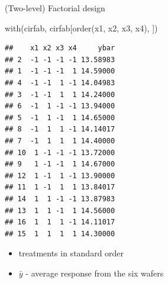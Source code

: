 \documentclass[
  ignorenonframetext,
]{beamer}
\newenvironment{Shaded}{\begin{snugshade}}{\end{snugshade}}
\newcommand{\FunctionTok}[1]{\textcolor[rgb]{0.00,0.00,0.00}{#1}}
\newcommand{\NormalTok}[1]{#1}
\begin{document}
\begin{frame}[fragile]{(Two-level) Factorial design}
\protect\hypertarget{two-level-factorial-design}{}
\begin{Shaded}
\begin{Highlighting}[]
\FunctionTok{with}\NormalTok{(cirfab, cirfab[}\FunctionTok{order}\NormalTok{(x1, x2, x3, x4), ])}
\end{Highlighting}
\end{Shaded}

\begin{verbatim}
##    x1 x2 x3 x4     ybar
## 2  -1 -1 -1 -1 13.58983
## 1  -1 -1 -1  1 14.59000
## 4  -1 -1  1 -1 14.04983
## 3  -1 -1  1  1 14.24000
## 6  -1  1 -1 -1 13.94000
## 5  -1  1 -1  1 14.65000
## 8  -1  1  1 -1 14.14017
## 7  -1  1  1  1 14.40000
## 10  1 -1 -1 -1 13.72000
## 9   1 -1 -1  1 14.67000
## 12  1 -1  1 -1 13.90000
## 11  1 -1  1  1 13.84017
## 14  1  1 -1 -1 13.87983
## 13  1  1 -1  1 14.56000
## 16  1  1  1 -1 14.11017
## 15  1  1  1  1 14.30000
\end{verbatim}

\begin{itemize}
\item
  treatments in standard order
\item
  \(\bar{y}\) - average response from the six wafers
\end{itemize}
\end{frame}
\end{document}
